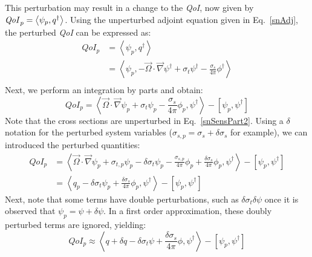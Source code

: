 \documentclass{article}
\newcommand{\vO}{\vec{\Omega}}
\newcommand{\bra}{\left\langle}
\newcommand{\ket}{\right\rangle}
\newcommand{\sbra}{\left[}
\newcommand{\sket}{\right]}
\newcommand{\grad}{\vec{\nabla}}
\newcommand{\sigt}{\sigma_t}
\newcommand{\sigs}{\sigma_s}
\newcommand{\angResp}{q^\dag}
\newcommand{\qoi}{{\it QoI}\xspace}
\begin{document}
This perturbation may result in a change to the \qoi, now given by $\qoi_p=\bra \psi_p , \angResp \ket$. Using the unperturbed adjoint equation given in Eq.~\eqref{snAdj},
the perturbed \qoi can be expressed as:
\begin{equation}
\label{snSensPart}
\begin{split}
QoI_p &=\bra \psi_p , \angResp \ket \\
&=\bra \psi_p , - \vO \cdot \grad \psi^\dag + \sigt \psi^\dag - \frac{\sigs}{4 \pi} \phi^\dag  \ket \\
\end{split}
\end{equation}
Next, we perform an integration by parts and obtain:
\begin{equation}
\label{snSensPart2}
QoI_p = \bra  \vO \cdot \grad \psi_p + \sigt \psi_p - \frac{\sigs}{4 \pi} \phi_p , \psi^\dag  \ket - \sbra \psi_p, \psi^\dag \sket
\end{equation}
Note that the cross sections are unperturbed in Eq.~\eqref{snSensPart2}.
Using a $\delta$ notation for the perturbed system variables ($\sigma_{s,p} = \sigs + \delta \sigs$ for example), we
can introduced the perturbed quantities:
\begin{equation}
\label{snSensPart3}
\begin{split}
QoI_p &= \bra  \vO \cdot \grad \psi_p + \sigma_{t,p}\psi_p - \delta\sigt\psi_p - \frac{\sigma_{s,p}}{4 \pi} \phi_p
+\frac{\delta \sigs}{4 \pi} \phi_p
 , \psi^\dag  \ket - \sbra \psi_p, \psi^\dag \sket \\
 &= \bra  q_p - \delta\sigt\psi_p + \frac{\delta \sigs}{4 \pi} \phi_p
 , \psi^\dag  \ket - \sbra \psi_p, \psi^\dag \sket
\end{split}
\end{equation}
Next, note that some terms have double perturbations, such as $\delta \sigt \delta \psi$ once it is observed
that $\psi_p=\psi+\delta\psi$. 
In a first order approximation, these doubly perturbed terms are ignored, yielding:
\begin{equation}
\label{snAdjQoI}
QoI_p \approx \bra  q + \delta q - \delta\sigt\psi + \frac{\delta \sigs}{4 \pi} \phi
 , \psi^\dag  \ket - \sbra \psi_p, \psi^\dag \sket\end{equation}
\end{document}
